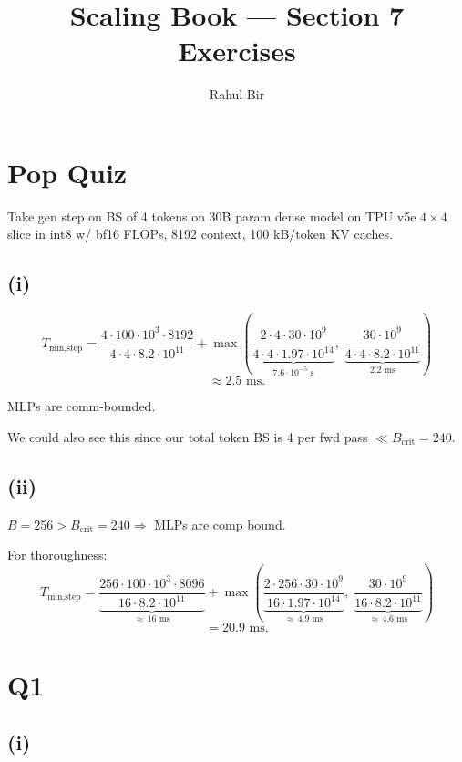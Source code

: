 \documentclass[11pt]{article}
\title{Scaling Book --- Section 7 Exercises}
\author{Rahul Bir}
\date{}
\begin{document}
\maketitle

\section*{Pop Quiz}

Take gen step on BS of 4 tokens on 30B param dense model on TPU v5e $4 \times 4$ slice in int8 w/ bf16 FLOPs, 8192 context, 100 kB/token KV caches.

\subsection*{(i)}

\[
T_{\text{min,step}} = \frac{4 \cdot 100 \cdot 10^3 \cdot 8192}{4 \cdot 4 \cdot 8.2 \cdot 10^{11}} + \max\!\left( \underbrace{\frac{2 \cdot 4 \cdot 30 \cdot 10^9}{4 \cdot 4 \cdot 1.97 \cdot 10^{14}}}_{7.6 \cdot 10^{-5}\text{ s}},\; \underbrace{\frac{30 \cdot 10^9}{4 \cdot 4 \cdot 8.2 \cdot 10^{11}}}_{2.2 \text{ ms}} \right)
\]
\[
\approx 2.5 \text{ ms.}
\]

MLPs are comm-bounded.

We could also see this since our total token BS is 4 per fwd pass $\ll B_{\text{crit}} = 240$.

\subsection*{(ii)}

$B = 256 > B_{\text{crit}} = 240 \Rightarrow$ MLPs are comp bound.

For thoroughness:
\[
T_{\text{min,step}} = \underbrace{\frac{256 \cdot 100 \cdot 10^3 \cdot 8096}{16 \cdot 8.2 \cdot 10^{11}}}_{\approx\, 16 \text{ ms}} + \max\!\left( \underbrace{\frac{2 \cdot 256 \cdot 30 \cdot 10^9}{16 \cdot 1.97 \cdot 10^{14}}}_{\approx\, 4.9 \text{ ms}},\; \underbrace{\frac{30 \cdot 10^9}{16 \cdot 8.2 \cdot 10^{11}}}_{\approx\, 4.6 \text{ ms}} \right)
\]
\[
= 20.9 \text{ ms}.
\]

\section*{Q1}

\subsection*{(i)}
\end{document}
